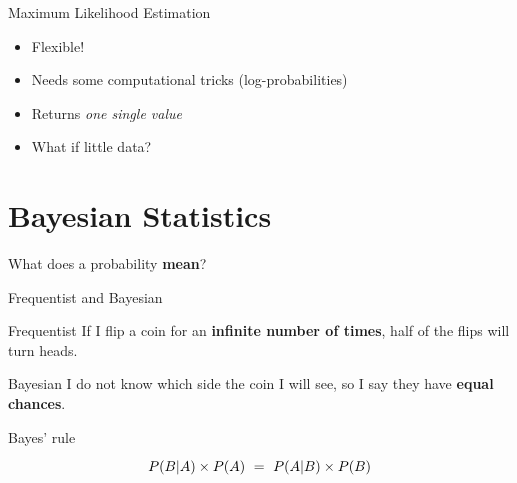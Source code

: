 \documentclass[aspectratio=169,xcolor=svgnames]{beamer}
\begin{document}
\begin{frame}{Maximum Likelihood Estimation}
  \begin{itemize}
  \item Flexible!
  \item Needs some computational tricks (log-probabilities)
  \item Returns \emph{one single value}
  \item What if little data?
  \end{itemize}
\end{frame}

\section{Bayesian Statistics}

\begin{frame}
  \center
  What does a probability \textbf{mean}?
\end{frame}

\begin{frame}{Frequentist and Bayesian}
  \begin{block}{Frequentist}
    If I flip a coin for an \textbf{infinite number of times},
    half of the flips will turn heads.
  \end{block}

  \begin{block}{Bayesian}
    I do not know which side the coin I will see,
    so I say they have \textbf{equal chances}.
  \end{block}
\end{frame}

\begin{frame}{Bayes' rule}
  \begin{equation*}
    \tikz[baseline]{\node[anchor=base] (pab) {$P(B|A) \times P(A)$}}
    =
    \tikz[baseline]{\node[anchor=base] (pba) {$P(A|B) \times P(B)$}}
  \end{equation*}
\end{frame}
\end{document}
